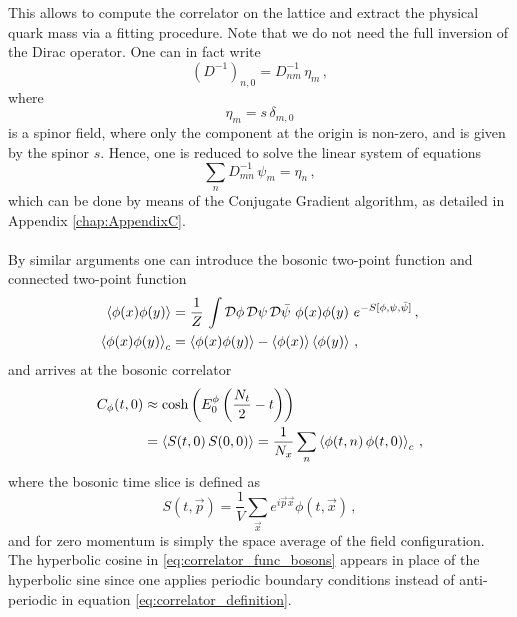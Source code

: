 This allows to compute the correlator on the lattice and extract the physical quark mass via a fitting procedure. Note that we do not need the full inversion of the Dirac operator. One can in fact write 
\begin{equation*}
    (D^{-1})_{n,0} = D^{-1}_{nm} \, \eta_{m} \, ,
\end{equation*}
where 
\begin{equation*} 
    \eta_{m} = s \, \delta_{m,0}
\end{equation*}
is a spinor field, where only the component at the origin is non-zero, and is given by the spinor $s$. Hence, one is reduced to solve the linear system of equations
\begin{equation*}
    \sum_n D^{-1}_{mn} \, \psi_m = \eta_n \, ,
\end{equation*}
which can be done by means of the Conjugate Gradient algorithm, as detailed in Appendix \ref{chap:AppendixC}.\\~\\
By similar arguments one can introduce the bosonic two-point function and connected two-point function 
\begin{equation*}
    \begin{aligned}
        \left\langle \phi(x)\phi(y) \right\rangle &= \frac{1}{Z} \, \int \mathcal{D}\phi \, \mathcal{D}\psi \, \mathcal{D}\bar\psi \ \phi(x) \phi(y) \ e^{-S[\phi, \psi, \bar\psi]} \, ,\\
        \left\langle \phi(x)\phi(y) \right\rangle_c &= \left\langle \phi(x)\phi(y) \right\rangle - \left\langle \phi(x) \right\rangle\left\langle \phi(y) \right\rangle \, ,
    \end{aligned}
\end{equation*}
and arrives at the bosonic correlator 
\begin{equation}
    \begin{aligned}
        C_\phi(t,0) &\approx \cosh \left(E_0^{\phi} \left(\frac{N_t}{2} - t\right)\right) \\
        &= \left\langle S(t,0) \, S(0,0) \right\rangle = \frac{1}{N_x} \sum_n \left\langle \phi(t,n) \, \phi(t,0) \right\rangle_c \, ,
    \end{aligned}
    \label{eq:correlator_func_bosons}
\end{equation}
where the bosonic time slice is defined as 
\begin{equation*}
    S(t, \vec{p})=\frac{1}{V} \sum_{\vec{x}} e^{i \vec{p} \vec{x}} \phi(t, \vec{x}) \, ,
\end{equation*}
and for zero momentum is simply the space average of the field configuration. \\
The hyperbolic cosine in \eqref{eq:correlator_func_bosons} appears in place of the hyperbolic sine since one applies periodic boundary conditions instead of anti-periodic in equation \eqref{eq:correlator_definition}. \\
